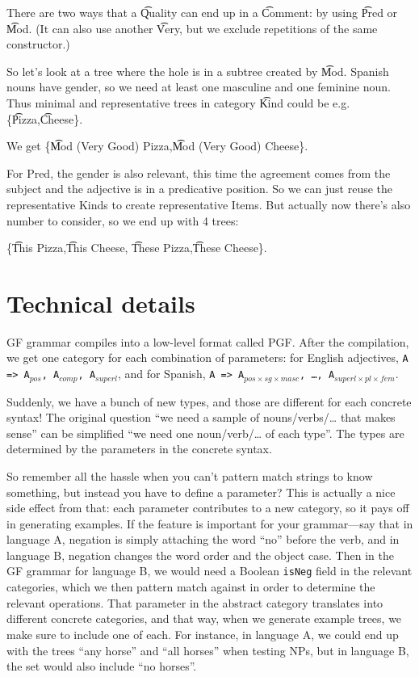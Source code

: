 There are two ways that a \t{Quality} can end up in a \t{Comment}: by using \t{Pred} or \t{Mod}. (It can also use another \t{Very}, but we exclude repetitions of the same constructor.) 

So let's look at a tree where the hole is in a subtree created by \t{Mod}.
Spanish nouns have gender, so we need at least one masculine and one feminine noun.
Thus minimal and representative trees in category \t{Kind} could be e.g. \{\t{Pizza},\t{Cheese}\}. 

We get \{\t{Mod (Very Good) Pizza},\t{Mod (Very Good) Cheese}\}. 

For Pred, the gender is also relevant, this time the agreement comes from the subject and the adjective is in a predicative position. So we can just reuse the representative Kinds to create representative Items. 
But actually now there's also number to consider, so we end up with 4 trees:

 \{\t{This Pizza},\t{This Cheese}, \t{These Pizza},\t{These Cheese}\}. 

\section{Technical details}

GF grammar compiles into a low-level format called PGF. After the
compilation, we get one category for each combination of parameters:
for English adjectives, \texttt{A => A$_{pos}$, A$_{comp}$,
A$_{superl}$}, and for Spanish, \texttt{A => A$_{pos×sg×masc}$, \dots,
A$_{superl×pl×fem}$}. 

Suddenly, we have a bunch of new types, and those are different for
each concrete syntax! The original question ``we need a sample of
nouns/verbs/… that makes sense'' can be simplified ``we need one
noun/verb/… of each type''. The types are determined by the parameters
in the concrete syntax. 

So remember all the hassle when you can't pattern match strings to
know something, but instead you have to define a parameter? This is
actually a nice side effect from that: each parameter contributes to a
new category, so it pays off in generating examples. If the feature is
important for your grammar---say that in language A, negation is
simply attaching the word  ``no'' before the verb, and in language B,
negation changes the word order and the object case. Then in the GF
grammar for language B, we would need a Boolean \texttt{isNeg} field
in the relevant categories, which we then pattern match against in
order to determine the relevant operations. That parameter in the
abstract category translates into different concrete categories, and
that way, when we generate example trees, we make sure to include one
of each. For instance, in language A, we could end up with the trees
``any horse'' and ``all horses'' when testing NPs, but in language B,
the set would also include ``no horses''. 

